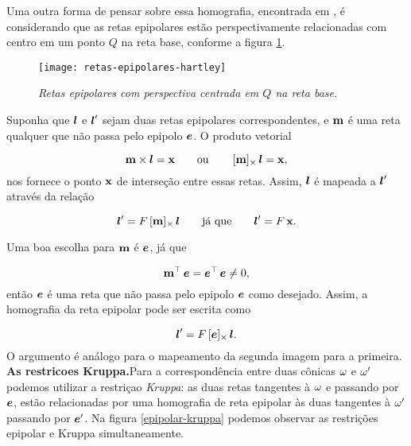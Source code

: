 Uma outra forma de pensar sobre essa homografia, encontrada em \cite{Hartley2004}, é considerando que as retas epipolares estão perspectivamente relacionadas com centro em um ponto $Q$ na reta base, conforme a figura \ref{fig.retas-epi-hartley}.

\begin{figure}[!htb]
\centering
\texttt{[image: retas-epipolares-hartley]}
\caption{\textit{Retas epipolares com perspectiva centrada em $Q$ na reta base.}}
\label{fig.retas-epi-hartley}
\end{figure}


Suponha que $\boldsymbol{l}$ e $\boldsymbol{l}'$ sejam duas retas epipolares correspondentes, e ${\bf m}$ é uma reta qualquer que não passa pelo epipolo $\boldsymbol{e}$. O produto vetorial 

\begin{equation*}
{\bf m}\times\boldsymbol{l}=\mathbf{x}\qquad\text{ou}\qquad\,[{\bf m}]_\times\,\boldsymbol{l}=\mathbf{x},
\end{equation*}
nos fornece o ponto $\mathbf{x}$ de interseção entre essas retas. Assim, $\boldsymbol{l}$ é mapeada a $\boldsymbol{l}'$ através da relação 

\begin{equation*}
\boldsymbol{l}'=F\,[{\bf m}]_\times\,\boldsymbol{l}\qquad\text{já que}\qquad\boldsymbol{l}'=F\,\mathbf{x}.
\end{equation*}


Uma boa escolha para ${\bf m}$ é $\boldsymbol{e}$, já que

\begin{equation*}
{\bf m}^\top\,\boldsymbol{e}=\boldsymbol{e}^\top\,\boldsymbol{e}\neq0,
\end{equation*}
então $\boldsymbol{e}$ é uma reta que não passa pelo epipolo $\boldsymbol{e}$ como desejado. Assim, a homografia da reta epipolar pode ser escrita como 

\begin{equation*}
\boldsymbol{l}'=F\,[\boldsymbol{e}]_\times\,\boldsymbol{l}.
\end{equation*}
O argumento é análogo para o mapeamento da segunda imagem para a primeira.\\


{\bf As restricoes Kruppa.}Para a correspondência entre duas cônicas ${\bf \omega}$ e ${\bf \omega'}$ podemos utilizar a restriçao \textit{Kruppa}: as duas retas tangentes à ${\bf \omega}$ e passando por $\boldsymbol{e}$, estão relacionadas por uma homografia de reta epipolar às duas tangentes à ${\bf \omega'}$ passando por $\boldsymbol{e}'$. Na figura \ref{epipolar-kruppa} podemos observar as restrições epipolar e Kruppa simultaneamente.


